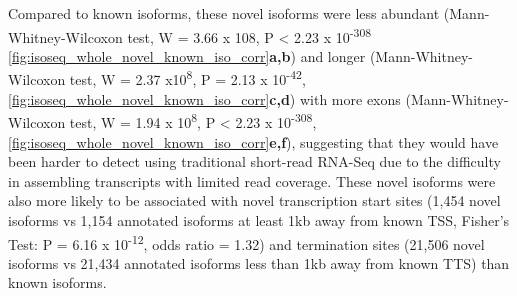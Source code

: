 Compared to known isoforms, these novel isoforms were less abundant (Mann-Whitney-Wilcoxon test, W = 3.66 x 108, P < 2.23 x 10\textsuperscript{-308} \cref{fig:isoseq_whole_novel_known_iso_corr}\textbf{a,b}) and longer (Mann-Whitney-Wilcoxon test, W = 2.37 x10\textsuperscript{8}, P = 2.13 x 10\textsuperscript{-42}, \cref{fig:isoseq_whole_novel_known_iso_corr}\textbf{c,d}) with more exons (Mann-Whitney-Wilcoxon test, W = 1.94 x 10\textsuperscript{8}, P < 2.23 x 10\textsuperscript{-308}, \cref{fig:isoseq_whole_novel_known_iso_corr}\textbf{e,f}), suggesting that they would have been harder to detect using traditional short-read RNA-Seq due to the difficulty in assembling transcripts with limited read coverage. These novel isoforms were also more likely to be associated with novel transcription start sites (1,454 novel isoforms vs 1,154 annotated isoforms at least 1kb away from known TSS, Fisher's Test: P = 6.16 x 10\textsuperscript{-12}, odds ratio = 1.32) and termination sites (21,506 novel isoforms vs 21,434 annotated isoforms less than 1kb away from known TTS) than known isoforms. 

